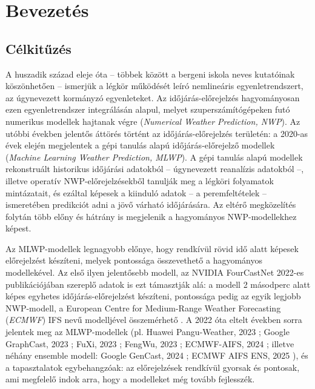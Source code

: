 \documentclass[12pt,a4paper]{article}
\begin{document}
\begin{abstract}
    Az alkalmazott lagrange-i megközelítés alapján tehát az AIFS is mutat kaotikus tulajdonságokat, ami azt jelenti, hogy a modell nem veszíti el teljesen a tanulás során a légkör ezen tulajdonságának reprezentálását, de az elmosódás hatása megfigyelhető.
\end{abstract}
\newpage

\section{Bevezetés}

\subsection{Célkitűzés}
A huszadik század eleje óta -- többek között a bergeni iskola neves kutatóinak köszönhetően -- ismerjük a légkör működését leíró nemlineáris egyenletrendszert, az úgynevezett kormányzó egyenleteket. Az időjárás-előrejelzés hagyományosan ezen egyenletrendszer integrálásán alapul, melyet szuperszámítógépeken futó numerikus modellek hajtanak végre (\textit{Numerical Weather Prediction, NWP}). Az utóbbi években jelentős áttörés történt az időjárás-előrejelzés területén: a 2020-as évek elején megjelentek a gépi tanulás alapú időjárás-előrejelző modellek (\textit{Machine Learning Weather Prediction, MLWP}). A gépi tanulás alapú modellek rekonstruált historikus időjárási adatokból -- úgynevezett reanalízis adatokból --, illetve operatív NWP-előrejelzésekből tanulják meg a légköri folyamatok mintázatait, és ezáltal képesek a kiinduló adatok -- a peremfeltételek -- ismeretében predikciót adni a jövő várható időjárására. Az eltérő megközelítés folytán több előny és hátrány is megjelenik a hagyományos NWP-modellekhez képest.

Az MLWP-modellek legnagyobb előnye, hogy rendkívül rövid idő alatt képesek előrejelzést készíteni, melyek pontossága összevethető a hagyományos modellekével. Az első ilyen jelentősebb modell, az NVIDIA FourCastNet 2022-es publikációjában szereplő adatok is ezt támasztják alá: a modell 2 másodperc alatt képes egyhetes időjárás-előrejelzést készíteni, pontossága pedig az egyik legjobb NWP-modell, a European Centre for Medium-Range Weather Forecasting (\textit{ECMWF}) IFS nevű modelljével összemérhető \cite{pathak_fourcastnet_2022}. A 2022 óta eltelt években sorra jelentek meg az MLWP-modellek (pl. Huawei Pangu-Weather, 2023 \cite{bi_accurate_2023}; Google GraphCast, 2023 \cite{lam_graphcast_2023}; FuXi, 2023 \cite{chen_fuxi_2023}; FengWu, 2023 \cite{chen_fengwu_2023}; ECMWF-AIFS, 2024 \cite{lang_aifs_2024}; illetve néhány ensemble modell: Google GenCast, 2024 \cite{price_gencast_2024}; ECMWF AIFS ENS, 2025 \cite{noauthor_aifs_2025}), és a tapasztalatok egybehangzóak: az előrejelzések rendkívül gyorsak és pontosak, ami megfelelő indok arra, hogy a modelleket még tovább fejlesszék.
\end{document}
